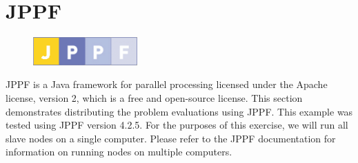 \section{JPPF}
\begin{figure}
  \includegraphics[width=4cm]{jppf.png}
\end{figure}
JPPF is a Java framework for parallel processing licensed under the Apache license, version 2, which is a free and open-source license.  This section demonstrates distributing the problem evaluations using JPPF.  This example was tested using JPPF version 4.2.5.  For the purposes of this exercise, we will run all slave nodes on a single computer.  Please refer to the JPPF documentation for information on running nodes on multiple computers.

